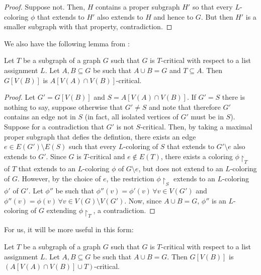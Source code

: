 \begin{proof}
Suppose not. Then, $H$ contains a proper subgraph $H'$ so that every $L$-coloring $\phi$ that extends to $H'$ also extends to $H$ and hence to $G$. But then $H'$ is a smaller subgraph with that property, contradiction. 
\end{proof}

We also have the following lemma from \cite{fivelistcoloring2}:

\begin{lemma}
\label{pregluinglemma}
Let $T$ be a subgraph of a graph $G$ such that $G$ is $T$-critical with respect to a list assignment $L$. Let $A, B \subseteq G$ be such that $A \cup B = G$ and $T \subseteq A$. Then $G[V(B)]$ is $A[V(A) \cap V(B)]$-critical.
\end{lemma}

\begin{proof} 
Let $G' = G[V(B)]$ and $S = A[V(A) \cap V(B)]$. If $G' = S$ there is nothing to say, suppose otherwise that $G' \neq S$ and note that therefore $G'$ contains an edge not in $S$ (in fact, all isolated vertices of $G'$ must be in $S$). Suppose for a contradiction that $G'$ is not $S$-critical. Then, by taking a maximal proper subgraph that defies the defintion, there exists an edge $e \in E(G') \setminus E(S)$ such that every $L$-coloring of $S$ that extends to $G' \setminus e$ also extends to $G'$. Since $G$ is $T$-critical and $e \not\in E(T)$, there exists a coloring $\phi\restriction_T$ of $T$ that extends to an $L$-coloring $\phi$ of $G \setminus e$, but does not extend to an $L$-coloring of $G$. However, by the choice of $e$, the restriction $\phi\restriction_S$ extends to an $L$-coloring $\phi'$ of $G'$. Let $\phi''$ be such that $\phi''(v) = \phi'(v) \, \forall v \in V(G')$ and $\phi''(v) = \phi(v) \, \forall v \in V(G) \setminus V(G')$. Now, since $A \cup B = G$, $\phi''$ is an $L$-coloring of $G$ extending $\phi\restriction_T$, a contradiction.
\end{proof}

For us, it will be more useful in this form: 

\begin{lemma}
\label{gluinglemma}
Let $T$ be a subgraph of a graph $G$ such that $G$ is $T$-critical with respect to a list assignment $L$. Let $A, B \subseteq G$ be such that $A \cup B = G$. Then $G[V(B)]$ is $(A[V(A) \cap V(B)] \cup T)$-critical.
\end{lemma}

